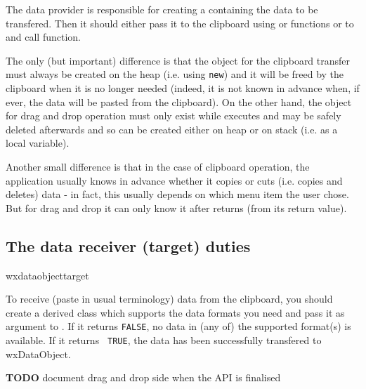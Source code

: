 The data provider is responsible for creating a 
 containing the data to be
transfered. Then it should either pass it to the clipboard using
 or 
functions or to  and call 
 function.

The only (but important) difference is that the object for the clipboard
transfer must always be created on the heap (i.e. using {\tt new}) and it will
be freed by the clipboard when it is no longer needed (indeed, it is not known
in advance when, if ever, the data will be pasted from the clipboard). On the
other hand, the object for drag and drop operation must only exist while 
 executes and may be safely deleted
afterwards and so can be created either on heap or on stack (i.e. as a local
variable).

Another small difference is that in the case of clipboard operation, the
application usually knows in advance whether it copies or cuts (i.e. copies and
deletes) data - in fact, this usually depends on which menu item the user
chose. But for drag and drop it can only know it after 
 returns (from its return value).

\subsection{The data receiver (target) duties}{wxdataobjecttarget}

To receive (paste in usual terminology) data from the clipboard, you should
create a  derived class which supports the
data formats you need and pass it as argument to 
. If it returns {\tt FALSE},
no data in (any of) the supported format(s) is available. If it returns {\tt
TRUE}, the data has been successfully transfered to wxDataObject.

{\bf TODO} document drag and drop side when the API is finalised

